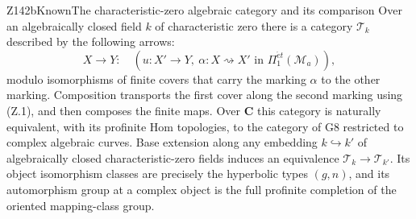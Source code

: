 \begin{result}{Z142b}{Known}{The characteristic-zero algebraic category and its comparison}
Over an algebraically closed field $k$ of characteristic zero there is
a category $\mathcal T_k$ described by the following arrows:
\[
 X\longrightarrow Y:\quad
 (u:X'\longrightarrow Y,\ \alpha:X\rightsquigarrow X'
                         \text{ in }\Pi_1^{\acute et}(\mathcal M_a)),
                                                               \tag{Z.2}
\]
modulo isomorphisms of finite covers that carry the marking $\alpha$
to the other marking. Composition transports the first cover along
the second marking using (Z.1), and then composes the finite maps.
Over $\mathbf C$ this category is naturally equivalent, with its
profinite Hom topologies, to the category of G8 restricted to complex
algebraic curves. Base extension along any embedding $k\hookrightarrow
k'$ of algebraically closed characteristic-zero fields induces an
equivalence $\mathcal T_k\to\mathcal T_{k'}$. Its object isomorphism
classes are precisely the hyperbolic types $(g,n)$, and its
automorphism group at a complex object is the full profinite
completion of the oriented mapping-class group.
\end{result}
